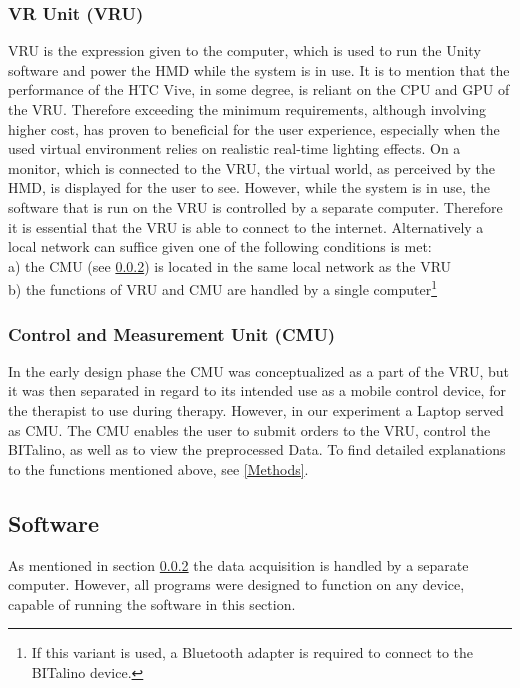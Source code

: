 \subsubsection{VR Unit (VRU)}
VRU is the expression given to the computer, which is used to run the Unity software and power the HMD while the system is in use. It is to mention that the performance of the HTC Vive, in some degree, is reliant on the CPU and GPU of the VRU. Therefore exceeding the minimum requirements, although involving higher cost, has proven to beneficial for the user experience, especially when the used virtual environment relies on realistic real-time lighting effects. On a monitor, which is connected to the VRU, the virtual world, as perceived by the HMD, is displayed for the user to see. However, while the system is in use, the software that is run on the VRU is controlled by a separate computer. Therefore it is essential that the VRU is able to connect to the internet. Alternatively a local network can suffice given one of the following conditions is met:\\[10pt]
a) the CMU (see \ref{CMU}) is located in the same local network as the VRU\\
b) the functions of VRU and CMU are handled by a single computer\footnote{If this variant is used, a Bluetooth adapter is required to connect to the BITalino device.}\\[10pt]
 
\subsubsection{Control and Measurement Unit (CMU)}\label{CMU}
In the early design phase the CMU was conceptualized as a part of the VRU, but it was then separated in regard to its intended use as a mobile control device, for the therapist to use during therapy. However, in our experiment a Laptop served as CMU. The CMU enables the user to submit orders to the VRU, control the BITalino, as well as to view the preprocessed Data. To find detailed explanations to the functions mentioned above, see \ref{Methods}.

\subsection{Software}
As mentioned in section \ref{CMU} the data acquisition is handled by a separate computer. However, all programs were designed to function on any device, capable of running the software in this section. 

